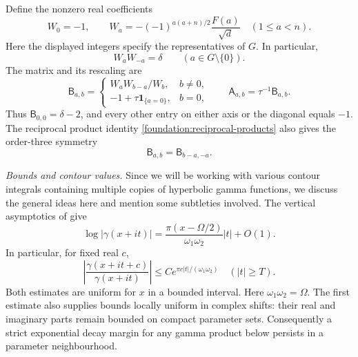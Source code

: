 \documentclass[11pt]{article}
\numberwithin{equation}{section}
\theoremstyle{definition}
\theoremstyle{remark}
\newcommand{\ind}[1]{\mathbf1_{\{#1\}}}
\begin{document}
Define the nonzero real coefficients
\begin{equation}\label{foundation:coefficients}
 W_0=-1,\qquad
 W_a=-(-1)^{a(a+n)/2}\frac{F(a)}{\sqrt d}
 \quad(1\leq a<n).
\end{equation}
Here the displayed integers specify the representatives of $G$.
In particular,
\begin{equation}\label{foundation:reciprocal-products}
 W_aW_{-a}=\delta\qquad(a\in G\setminus\{0\}).
\end{equation}
The matrix and its rescaling are
\begin{equation}\label{foundation:core}
 \mathsf B_{a,b}=
 \begin{cases}
  W_aW_{b-a}/W_b,&b\ne0,\\
  -1+\tau\ind{a=0},&b=0,
 \end{cases}
 \qquad \mathsf A_{a,b}=\tau^{-1}\mathsf B_{a,b}.
\end{equation}
Thus $\mathsf B_{0,0}=\delta-2$, and every other entry on either
axis or the diagonal equals $-1$. The reciprocal product identity
\eqref{foundation:reciprocal-products} also gives the order-three symmetry
\begin{equation}\label{foundation:rotation}
 \mathsf B_{a,b}=\mathsf B_{b-a,-a}.
\end{equation}

\emph{Bounds and contour values.} Since we will be working with various contour integrals containing multiple copies of hyperbolic gamma functions, we discuss the general ideas here and mention some subtleties involved.
The vertical asymptotics of \cite[Section~1]{BSS} give
\[
 \log|\gamma(x+it)|
 =\frac{\pi(x-\Omega/2)}{\omega_1\omega_2}|t|+O(1).
\]
In particular, for fixed real $c$,
\[
 \left|\frac{\gamma(x+it+c)}{\gamma(x+it)}\right|
 \leq C e^{\pi c|t|/(\omega_1\omega_2)}
 \quad(|t|\geq T).
\]
Both estimates are uniform for $x$ in a bounded interval.
Here $\omega_1\omega_2=\Omega$. The first estimate
also supplies bounds locally uniform in complex shifts: their real
and imaginary parts remain bounded on compact parameter sets.
Consequently a strict exponential decay margin for any gamma product
below persists in a parameter neighbourhood.
\end{document}
